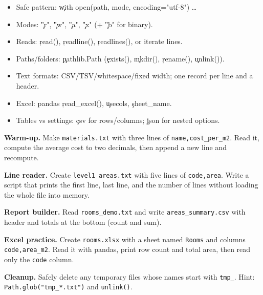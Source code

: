 \begin{tcolorbox}[%
    colframe=orange,
    colback = white,
    arc=2mm %
 ]

\begin{itemize}
  \item Safe pattern: \c{with open(path, mode, encoding="utf-8")} \dots
  \item Modes: \c{"r"}, \c{"w"}, \c{"a"}, \c{"x"} (+ \c{"b"} for binary).
  \item Reads: \c{read()}, \c{readline()}, \c{readlines()}, or iterate lines.
  \item Paths/folders: \c{pathlib.Path} (\c{exists()}, \c{mkdir()}, \c{rename()}, \c{unlink()}).
  \item Text formats: CSV/TSV/whitespace/fixed width; one record per line and a header.
  \item Excel: pandas \c{read\_excel()}, \c{usecols}, \c{sheet\_name}.
  \item Tables vs settings: \c{csv} for rows/columns; \c{json} for nested options.
\end{itemize}
\end{tcolorbox}

\textbf{Warm-up.} Make \texttt{materials.txt} with three lines of \texttt{name,cost\_per\_m2}. Read it, compute the average cost to two decimals, then append a new line and recompute.

\textbf{Line reader.} Create \texttt{level1\_areas.txt} with five lines of \texttt{code,area}. Write a script that prints the first line, last line, and the number of lines without loading the whole file into memory.

\textbf{Report builder.} Read \texttt{rooms\_demo.txt} and write \texttt{areas\_summary.csv} with header and totals at the bottom (count and sum).

\textbf{Excel practice.} Create \texttt{rooms.xlsx} with a sheet named \texttt{Rooms} and columns \texttt{code,area\_m2}. Read it with pandas, print row count and total area, then read only the \texttt{code} column.

\textbf{Cleanup.} Safely delete any temporary files whose names start with \texttt{tmp\_}. Hint: \texttt{Path.glob("tmp\_*.txt")} and \texttt{unlink()}.
